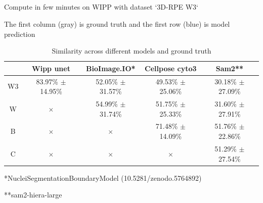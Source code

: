 \subsection{\slidetitle}
\begin{frame}
  \frametitle{\sectiontitle}
  \framesubtitle{\slidetitle}

  Compute in few minutes on WIPP with dataset `3D-RPE W3`

  The first column (gray) is ground truth and the first row (blue) is model prediction

  \begin{center}
    \begin{table}
      \begin{tabular}{|c|c|c|c|c|}
       \hline
       \rowcolor{tableFirstRowColor}      & Wipp unet             & BioImage.IO*          & Cellpose cyto3        & Sam2**   \\ [0.5ex]
       \hline
       \cellcolor{tableFirstColColor} W3  & 83.97\% $\pm$ 14.95\% & 52.05\% $\pm$ 31.57\% & 49.53\% $\pm$ 25.06\% & 30.18\% $\pm$ 27.09\% \\
       \hline
       \cellcolor{tableFirstColColor} W   & $\times$              & 54.99\% $\pm$ 31.74\% & 51.75\% $\pm$ 25.33\% & 31.60\% $\pm$ 27.91\% \\
       \hline
       \cellcolor{tableFirstColColor} B   & $\times$              & $\times$              & 71.48\% $\pm$ 14.09\% & 51.76\% $\pm$ 22.86\% \\
       \hline
       \cellcolor{tableFirstColColor} C   & $\times$              & $\times$              & $\times$              & 51.29\% $\pm$ 27.54\% \\
       \hline
      \end{tabular}
      \caption{Similarity across different models and ground truth}
    \end{table}
  \end{center}

  *NucleiSegmentationBoundaryModel (10.5281/zenodo.5764892)

  **sam2-hiera-large

\end{frame}

\def\slidetitle{Explaining poor 3D results}

